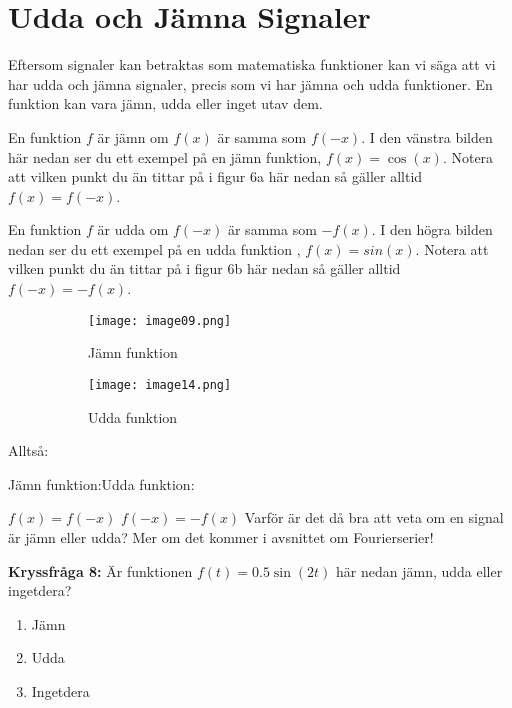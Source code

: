 \documentclass{article}
\begin{document}
\section*{Udda och Jämna Signaler}

Eftersom signaler kan betraktas som matematiska funktioner kan vi säga att vi
har udda och jämna signaler, precis som vi har jämna och udda funktioner.
En funktion kan vara jämn, udda eller inget utav dem.

En funktion $f$ är jämn om $f(x)$ är samma som $f(-x)$.
I den vänstra bilden här nedan ser du ett exempel på en jämn funktion,
$f(x)=\cos(x)$. Notera att vilken punkt du än tittar på i figur 6a här
nedan så gäller alltid  $f(x) = f(-x)$.

En funktion $f$ är udda om $f(-x)$ är samma som $-f(x)$. I den högra bilden
nedan ser du ett exempel på en udda funktion , $f(x)=sin(x)$.
Notera att vilken punkt du än tittar på i figur 6b här nedan så gäller
alltid $f(-x) = -f(x)$.

\begin{figure}[ht]
\centering
\begin{subfigure}{0.50\textwidth}
  \centering
  \texttt{[image: image09.png]}
  \caption{Jämn funktion}
  \label{}
\end{subfigure}%
\begin{subfigure}{0.50\textwidth}
  \centering
  \texttt{[image: image14.png]}
  \caption{Udda funktion}
 \label{}
\end{subfigure}%
\caption{}
\label{}
\end{figure}



\begin{center}
Alltså:
\end{center}

Jämn funktion:\hfill Udda funktion:

$ f(x)=f(-x)$ \hfill $f(-x)=-f(x) $
\newline
\newline
Varför är det då bra att veta om en signal är jämn eller udda?
Mer om det kommer i avsnittet om Fourierserier!

\newpage

\textbf{Kryssfråga 8:} Är funktionen $f(t)=0.5\sin(2t)$ här nedan jämn,
udda eller ingetdera?
\begin{enumerate}[label={\alph*)},font={\bfseries}]
    \item Jämn
    \item Udda
    \item Ingetdera
\end{enumerate}
\end{document}
